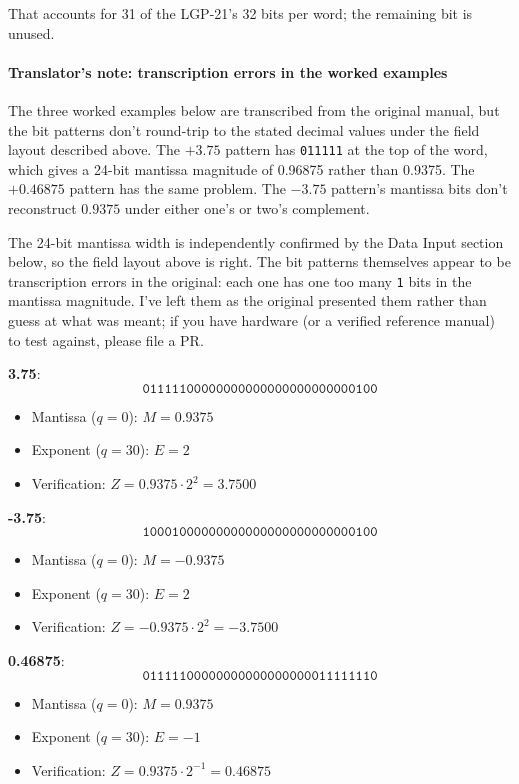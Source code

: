 That accounts for 31 of the LGP-21's 32 bits per word; the remaining bit is unused.

\paragraph{Translator's note: transcription errors in the worked examples}
The three worked examples below are transcribed from the original manual, but the bit patterns don't round-trip to the stated decimal values under the field layout described above. The $+3.75$ pattern has \texttt{011111} at the top of the word, which gives a 24-bit mantissa magnitude of 0.96875 rather than 0.9375. The $+0.46875$ pattern has the same problem. The $-3.75$ pattern's mantissa bits don't reconstruct $0.9375$ under either one's or two's complement.

The 24-bit mantissa width is independently confirmed by the Data Input section below, so the field layout above is right. The bit patterns themselves appear to be transcription errors in the original: each one has one too many \texttt{1} bits in the mantissa magnitude. I've left them as the original presented them rather than guess at what was meant; if you have hardware (or a verified reference manual) to test against, please file a PR.

\medskip
\textbf{3.75}:
\[ \texttt{01111100000000000000000000000100} \]
\begin{itemize}[label=---, leftmargin=1.5em, itemsep=2pt]
    \item Mantissa ($q = 0$): $M = 0.9375$
    \item Exponent ($q = 30$): $E = 2$
    \item Verification: $Z = 0.9375 \cdot 2^2 = 3.7500$
\end{itemize}

\medskip
\textbf{-3.75}:
\[ \texttt{10001000000000000000000000000100} \]
\begin{itemize}[label=---, leftmargin=1.5em, itemsep=2pt]
    \item Mantissa ($q = 0$): $M = -0.9375$
    \item Exponent ($q = 30$): $E = 2$
    \item Verification: $Z = -0.9375 \cdot 2^2 = -3.7500$
\end{itemize}

\medskip
\textbf{0.46875}:
\[ \texttt{01111100000000000000000011111110} \]
\begin{itemize}[label=---, leftmargin=1.5em, itemsep=2pt]
    \item Mantissa ($q = 0$): $M = 0.9375$
    \item Exponent ($q = 30$): $E = -1$
    \item Verification: $Z = 0.9375 \cdot 2^{-1} = 0.46875$
\end{itemize}

